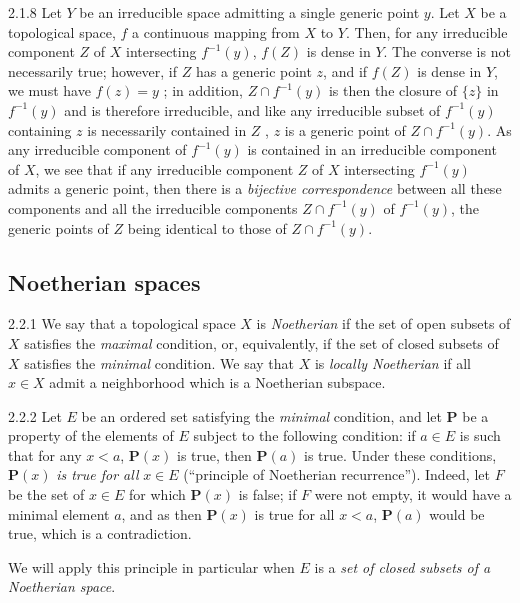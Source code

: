 \documentclass{book}
\begin{document}
\begin{env}{2.1.8}
\label{env-0.2.1.8}
Let $Y$ be an irreducible space admitting a single generic point $y$.
Let $X$ be a topological space, $f$ a continuous mapping from $X$ to $Y$. Then, for
any irreducible component $Z$ of $X$ intersecting $f^{-1}(y)$, $f(Z)$ is dense in $Y$. The
converse is not necessarily true; however, if $Z$ has a generic point $z$,
and if $f(Z)$ is dense in $Y$, we must have $f(z)=y$ ; in addition, $Z\cap f^{-1}(y)$
is then the closure of $\{z\}$ in $f^{-1}(y)$ and is therefore irreducible, and like any
irreducible subset of $f^{-1}(y)$ containing $z$ is necessarily contained in $Z$ , $z$ is
a generic point of $Z\cap f^{-1}(y)$. As any irreducible component of $f^{-1}(y)$ is
contained in an irreducible component of $X$, we see that if any irreducible component
$Z$ of $X$ intersecting $f^{-1}(y)$ admits a generic point, then there is a \emph{bijective correspondence}
between all these components and all the irreducible components
$Z\cap f^{-1}(y)$ of $f^{-1}(y)$, the generic points of $Z$ being identical to those of $Z\cap f^{-1}(y)$.
\end{env}

\subsection{Noetherian spaces}
\label{0-prelim-2.2}

\begin{env}{2.2.1}
\label{env-0.2.2.1}
We say that a topological space $X$ is \emph{Noetherian} if the set of open
subsets of $X$ satisfies the \emph{maximal} condition, or, equivalently, if the set of closed
subsets of $X$ satisfies the \emph{minimal} condition. We say that $X$ is
\emph{locally Noetherian} if all $x\in X$ admit a neighborhood which is a Noetherian subspace.
\end{env}

\begin{env}{2.2.2}
\label{env-0.2.2.2}
Let $E$ be an ordered set satisfying the \emph{minimal} condition, and let $\mathbf{P}$ be a
property of the elements of $E$ subject to the following condition: if $a\in E$ is such that
for any $x<a$, $\mathbf{P}(x)$ is true, then $\mathbf{P}(a)$ is true. Under these conditions,
$\mathbf{P}(x)$ \emph{is true for all} $x\in E$
(``principle of Noetherian recurrence''). Indeed, let $F$ be the set of $x\in E$ for
which $\mathbf{P}(x)$ is false; if $F$ were not empty, it would have a minimal element $a$,
and as then $\mathbf{P}(x)$ is true for all $x<a$, $\mathbf{P}(a)$ would be true, which is
a contradiction.

We will apply this principle in particular when $E$ is a
\emph{set of closed subsets of a Noetherian space}.
\end{env}
\end{document}
